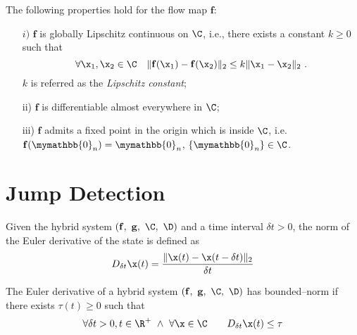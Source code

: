 \begin{assum}\label{ass:2}
The following properties hold for the flow map $\mathbf{\mathbf{f}}$:
\begin{itemize}
	\item[$i)$]  $\mathbf{\mathbf{f}}$ is globally Lipschitz continuous on $\C$, i.e., there exists a constant $k\geq 0$ such that
	\[\forall\x_1,\x_2\in\C\quad\|\mathbf{\mathbf{f}}(\x_1)-\mathbf{\mathbf{f}}(\x_2)\|_2\leq k \|\x_1-\x_2\|_2~. \]
	$k$ is referred as the \textit{Lipschitz constant};
	\item[ii)] $\mathbf{\mathbf{f}}$ is differentiable almost everywhere in $\C$;
	\item[iii)] $\mathbf{\mathbf{f}}$ admits a fixed point in the origin which is inside $\C$, i.e. $\mathbf{\mathbf{f}}(\mymathbb{0}_n)=\mymathbb{0}_n$, $\{\mymathbb{0}_n\}\in\C$.
\end{itemize} 
\end{assum}

\clearpage
\section{Jump Detection}\label{JumpD}
%
\begin{defn}
	Given the hybrid system $(\mathbf{\mathbf{f}},~\mathbf{g},~\C,~\D)$ and a time interval $\delta t>0$, the norm of the Euler derivative of the state is defined as
	\[D_{\delta t}\x(t)= \frac{\|\x(t)-\x(t-\delta t)\|_2}{\delta t}\]
\end{defn}
%
\begin{defn}
	The Euler derivative of a hybrid system $(\mathbf{\mathbf{f}},~\mathbf{g},~\C,~\D)$ has bounded--norm if there exists $\tau(t)\geq 0$ such that
	\[\forall\delta t>0,t\in\R^+~\land~\forall \x\in\C\quad\quad D_{\delta t}\x(t)\leq\tau\]
\end{defn}
%

